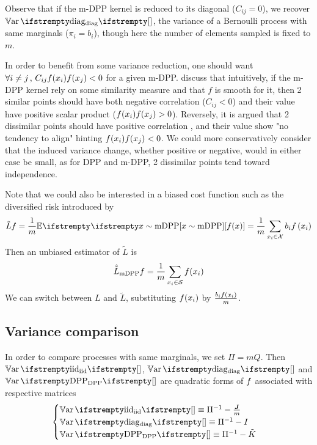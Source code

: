 Observe that if the m-DPP kernel is reduced to its diagonal ($C_{ij} = 0$), we recover $\Var{\textrm{diag}}{}$, the variance of a Bernoulli process with same marginals ($\pi_i = b_i$), though here the number of elements sampled is fixed to $m$.

In order to benefit from some variance reduction, one should want $\forall i\neq j \,,\, C_{ij}f(x_i) f(x_j) <0$ for a given m-DPP.
\cite{zhang2017dppminibatch} discuss that intuitively, if the m-DPP kernel rely on some similarity measure and that $f$ is smooth for it, then 2 similar points should have both negative correlation ($C_{ij}<0$) and their value have positive scalar product ($f(x_i) f(x_j) > 0$). Reversely, it is argued that 2 dissimilar points should have positive correlation 
, and their value show "no tendency to align" hinting $f(x_i) f(x_j) < 0$. We could more conservatively consider that the induced variance change, whether positive or negative, would in either case be small, as for DPP and m-DPP, 2 dissimilar points tend toward independence.



Note that we could also be interested in a biased cost function such as the diversified risk introduced by \cite{zhang2017dppminibatch}
$$
\tilde L{\query} =\frac{1}{m}\EE{}{x \sim \textrm{mDPP}}[\query(x)]=\frac{1}{m}\sum_{x_i \in \mathcal X} b_{i} \query\left(x_{i}\right)
$$
Then an unbiased estimator of $\tilde L$ is
\begin{equation*}
	\hat{\tilde L}_{\textrm{mDPP}}{f} = \frac{1}{m}\sum_{x_i\in \mathcal S} f(x_i)
\end{equation*}
We can switch between $L$ and $\tilde L$, substituting $f(x_i)$ by $\frac{b_i f(x_i)}{m}$.


\subsection{Variance comparison}
In order to compare processes with same marginals, we set $\Pi = mQ$. Then $\Var{\textrm{iid}}{}$, $\Var{\textrm{diag}}{}$ and $\Var{\textrm{DPP}}{}$ are quadratic forms of $f$ associated with respective matrices
$$\begin{cases}
	\Var{\textrm{iid}}{} \equiv \Pi^{-1} - \frac{\moones}{m} \\
	\Var{\textrm{diag}}{} \equiv \Pi^{-1} - I \\
	\Var{\textrm{DPP}}{} \equiv \Pi^{-1} - \tilde K
\end{cases}$$

